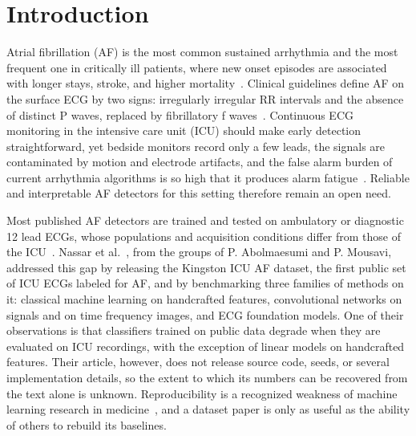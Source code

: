 \documentclass[conference,a4paper]{IEEEtran}
\begin{document}
\section{Introduction}
\label{sec:intro}

Atrial fibrillation (AF) is the most common sustained arrhythmia and the most frequent one in critically ill patients, where new onset episodes are associated with longer stays, stroke, and higher mortality~\cite{kornej2020,moss2017,walkey2011}. Clinical guidelines define AF on the surface ECG by two signs: irregularly irregular RR intervals and the absence of distinct P waves, replaced by fibrillatory f waves~\cite{hindricks2021}. Continuous ECG monitoring in the intensive care unit (ICU) should make early detection straightforward, yet bedside monitors record only a few leads, the signals are contaminated by motion and electrode artifacts, and the false alarm burden of current arrhythmia algorithms is so high that it produces alarm fatigue~\cite{drew2014}. Reliable and interpretable AF detectors for this setting therefore remain an open need.

Most published AF detectors are trained and tested on ambulatory or diagnostic 12 lead ECGs, whose populations and acquisition conditions differ from those of the ICU~\cite{reyna2022}. Nassar et al.~\cite{nassar2025}, from the groups of P. Abolmaesumi and P. Mousavi, addressed this gap by releasing the Kingston ICU AF dataset, the first public set of ICU ECGs labeled for AF, and by benchmarking three families of methods on it: classical machine learning on handcrafted features, convolutional networks on signals and on time frequency images, and ECG foundation models. One of their observations is that classifiers trained on public data degrade when they are evaluated on ICU recordings, with the exception of linear models on handcrafted features. Their article, however, does not release source code, seeds, or several implementation details, so the extent to which its numbers can be recovered from the text alone is unknown. Reproducibility is a recognized weakness of machine learning research in medicine~\cite{pineau2021}, and a dataset paper is only as useful as the ability of others to rebuild its baselines.
\end{document}
